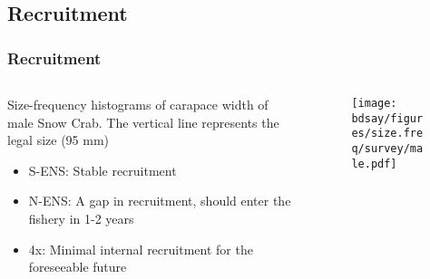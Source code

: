 \documentclass{beamer}
\numberwithin{equation}{section}		%
\numberwithin{figure}{section}	   	%
\numberwithin{table}{section}				%
\newcommand{\yr}{2016}
\newcommand{\bd}{\string~/bio.data}   %
\newcommand{\bds}{\bd/bio.snowcrab}
\newcommand{\bdsa}{\bds/assessments}
\newcommand{\bdsay}{\bdsa/\yr}
\begin{document}


\subsection{Recruitment}
\begin{frame}
\frametitle{Recruitment}
\begin{columns}
	\begin{column}{0.5\textwidth}
	Size-frequency histograms of carapace width of male Snow Crab. The vertical line represents the legal size (95 mm)
	\begin{itemize}
		\item S-ENS: Stable recruitment
		\item N-ENS: A gap in recruitment, should enter the fishery in 1-2 years
		\item 4x: Minimal internal recruitment for the foreseeable future  
	\end{itemize}
	\end{column}

	\begin{column}{0.5\textwidth}
	\begin{figure}
		\texttt{[image: \\bdsay/figures/size.freq/survey/male.pdf]}
	\end{figure}
	\end{column}
	\end{columns}
\end{frame}


\end{document}
